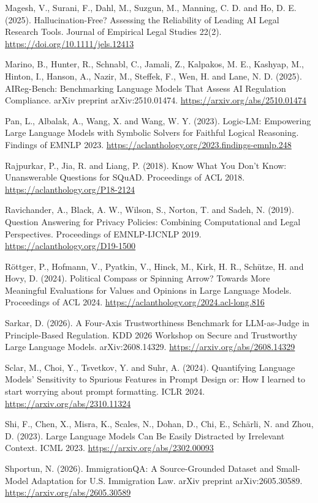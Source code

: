 \documentclass[10pt,twocolumn]{article}
\begin{document}
Magesh, V., Surani, F., Dahl, M., Suzgun, M., Manning, C. D. and Ho, D. E. (2025). Hallucination-Free? Assessing the Reliability of Leading AI Legal Research Tools. Journal of Empirical Legal Studies 22(2). \url{https://doi.org/10.1111/jels.12413}

Marino, B., Hunter, R., Schnabl, C., Jamali, Z., Kalpakos, M. E., Kashyap, M., Hinton, I., Hanson, A., Nazir, M., Steffek, F., Wen, H. and Lane, N. D. (2025). AIReg-Bench: Benchmarking Language Models That Assess AI Regulation Compliance. arXiv preprint arXiv:2510.01474. \url{https://arxiv.org/abs/2510.01474}

Pan, L., Albalak, A., Wang, X. and Wang, W. Y. (2023). Logic-LM: Empowering Large Language Models with Symbolic Solvers for Faithful Logical Reasoning. Findings of EMNLP 2023. \url{https://aclanthology.org/2023.findings-emnlp.248}

Rajpurkar, P., Jia, R. and Liang, P. (2018). Know What You Don't Know: Unanswerable Questions for SQuAD. Proceedings of ACL 2018. \url{https://aclanthology.org/P18-2124}

Ravichander, A., Black, A. W., Wilson, S., Norton, T. and Sadeh, N. (2019). Question Answering for Privacy Policies: Combining Computational and Legal Perspectives. Proceedings of EMNLP-IJCNLP 2019. \url{https://aclanthology.org/D19-1500}

Röttger, P., Hofmann, V., Pyatkin, V., Hinck, M., Kirk, H. R., Schütze, H. and Hovy, D. (2024). Political Compass or Spinning Arrow? Towards More Meaningful Evaluations for Values and Opinions in Large Language Models. Proceedings of ACL 2024. \url{https://aclanthology.org/2024.acl-long.816}

Sarkar, D. (2026). A Four-Axis Trustworthiness Benchmark for LLM-as-Judge in Principle-Based Regulation. KDD 2026 Workshop on Secure and Trustworthy Large Language Models. arXiv:2608.14329. \url{https://arxiv.org/abs/2608.14329}

Sclar, M., Choi, Y., Tsvetkov, Y. and Suhr, A. (2024). Quantifying Language Models' Sensitivity to Spurious Features in Prompt Design or: How I learned to start worrying about prompt formatting. ICLR 2024. \url{https://arxiv.org/abs/2310.11324}

Shi, F., Chen, X., Misra, K., Scales, N., Dohan, D., Chi, E., Schärli, N. and Zhou, D. (2023). Large Language Models Can Be Easily Distracted by Irrelevant Context. ICML 2023. \url{https://arxiv.org/abs/2302.00093}

Shportun, N. (2026). ImmigrationQA: A Source-Grounded Dataset and Small-Model Adaptation for U.S. Immigration Law. arXiv preprint arXiv:2605.30589. \url{https://arxiv.org/abs/2605.30589}
\end{document}
